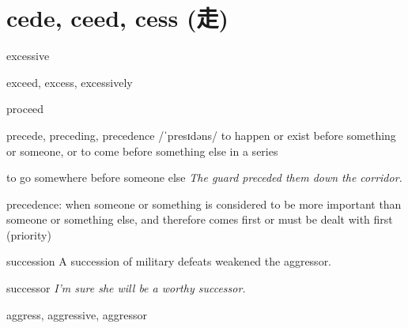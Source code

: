 \chapter{cede, ceed, cess (走)}

\begin{word}{excessive}
\end{word}

\begin{word}{exceed, excess, excessively}
\end{word}

\begin{word}{proceed}
\end{word}

\begin{word}{precede, preceding, precedence /ˈpresɪdəns/}
    to happen or exist before something or someone, or to come before something else in a series

    to go somewhere before someone else
    \textit{The guard preceded them down the corridor.}

    precedence: when someone or something is considered to be more important than someone or something else, and therefore comes first or must be dealt with first (priority)
\end{word}

\begin{word}{succession}
    A succession of military defeats weakened the aggressor.
\end{word}

\begin{word}{successor}
    \textit{I'm sure she will be a worthy successor.}
\end{word}

\begin{word}{aggress, aggressive, aggressor}
\end{word}